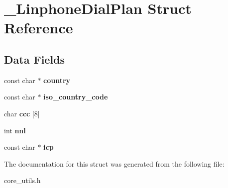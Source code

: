 \section{\+\_\+\+Linphone\+Dial\+Plan Struct Reference}
\label{struct__LinphoneDialPlan}
\subsection*{Data Fields}
\begin{DoxyCompactItemize}
\item 
\mbox{\label{struct__LinphoneDialPlan_a4cf1bedbd4f79820f19dd42ff36816a7}} 
const char $\ast$ {\bfseries country}
\item 
\mbox{\label{struct__LinphoneDialPlan_a03d6ff12360835ecb9647e9d564018d1}} 
const char $\ast$ {\bfseries iso\+\_\+country\+\_\+code}
\item 
\mbox{\label{struct__LinphoneDialPlan_a16074d134299065b40707123caad267b}} 
char {\bfseries ccc} [8]
\item 
\mbox{\label{struct__LinphoneDialPlan_a8bae85daf864aca10bf399b71899bc0f}} 
int {\bfseries nnl}
\item 
\mbox{\label{struct__LinphoneDialPlan_aadd1ef0f342c7a280dbb77fde3eebf66}} 
const char $\ast$ {\bfseries icp}
\end{DoxyCompactItemize}


The documentation for this struct was generated from the following file\+:\begin{DoxyCompactItemize}
\item 
core\+\_\+utils.\+h\end{DoxyCompactItemize}
